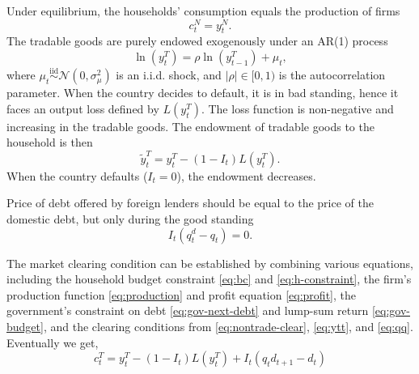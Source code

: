 Under equilibrium, the households' consumption equals the production of firms
\begin{equation}
    \label{eq:nontrade-clear}
    c^N_{t} = y^N_t.
\end{equation}
The tradable goods are purely endowed exogenously under an AR(1) process
\begin{equation}
    \ln(y_t^T) = \rho \ln(y^T_{t-1}) + \mu_t,
\end{equation}
where $\mu_t \overset{\mathrm{iid}}{\sim} \mathcal{N}(0,\sigma_\mu^2)$ is an i.i.d. shock, and $ |\rho| \in [0,1)$ is the autocorrelation parameter.
When the country decides to default, it is in bad standing, hence it faces an output loss defined by $L(y^T_t)$. The loss function is non-negative and increasing in the tradable goods. The endowment of tradable goods to the household is then
\begin{equation}
    \label{eq:ytt}
    \tilde{y}^T_t =
        y^T_t  - (1 - I_t) L(y^T_t).
\end{equation}
When the country defaults ($I_t = 0$), the endowment decreases.

Price of debt offered by foreign lenders should be equal to the price of the domestic debt, but only during the good standing
\begin{equation}
    \label{eq:qq}
    I_t(q^d_t - q_t) = 0.
\end{equation}

The market clearing condition can be established by combining various equations, including the household budget constraint \eqref{eq:bc} and \eqref{eq:h-constraint}, the firm's production function \eqref{eq:production} and profit equation \eqref{eq:profit}, the government's constraint on debt \eqref{eq:gov-next-debt} and lump-sum return \eqref{eq:gov-budget}, and the clearing conditions from \eqref{eq:nontrade-clear}, \eqref{eq:ytt}, and \eqref{eq:qq}.
Eventually we get,
\begin{equation}
    \label{eq:market-clearing}
    c^T_t = y^T_t - (1 - I_t)L(y^T_t) + I_t(q_t d_{t+1} - d_t)
\end{equation}

